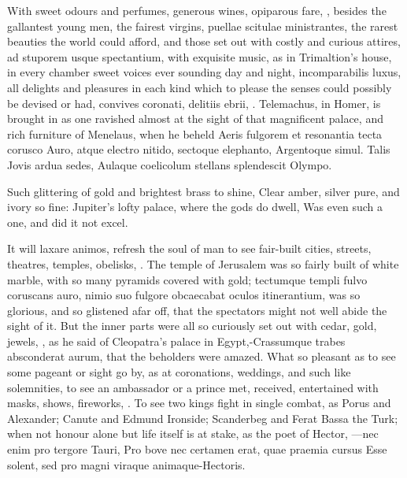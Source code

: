 {With sweet odours and perfumes, generous wines, opiparous fare, \etc{},
besides the gallantest young men, the fairest virgins, puellae
scitulae ministrantes, the rarest beauties the world could afford, and
those set out with costly and curious attires, ad stuporem usque
spectantium, with exquisite music, as in Trimaltion's house, in
every chamber sweet voices ever sounding day and night, incomparabilis
luxus, all delights and pleasures in each kind which to please the
senses could possibly be devised or had, convives coronati, delitiis
ebrii, \etc{}. Telemachus, in Homer, is brought in as one ravished almost
at the sight of that magnificent palace, and rich furniture of
Menelaus, when he beheld
Aeris fulgorem et resonantia tecta corusco
Auro, atque electro nitido, sectoque elephanto,
Argentoque simul. Talis Jovis ardua sedes,
Aulaque coelicolum stellans splendescit Olympo.

Such glittering of gold and brightest brass to shine,
Clear amber, silver pure, and ivory so fine:
Jupiter's lofty palace, where the gods do dwell,
Was even such a one, and did it not excel.

It will laxare animos, refresh the soul of man to see fair-built
cities, streets, theatres, temples, obelisks, \etc{}. The temple of
Jerusalem was so fairly built of white marble, with so many pyramids
covered with gold; tectumque templi fulvo coruscans auro, nimio suo
fulgore obcaecabat oculos itinerantium, was so glorious, and so
glistened afar off, that the spectators might not well abide the sight
of it. But the inner parts were all so curiously set out with cedar,
gold, jewels, \etc{}, as he said of Cleopatra's palace in
Egypt,-Crassumque trabes absconderat aurum, that the beholders
were amazed. What so pleasant as to see some pageant or sight go by, as
at coronations, weddings, and such like solemnities, to see an
ambassador or a prince met, received, entertained with masks, shows,
fireworks, \etc{}. To see two kings fight in single combat, as Porus and
Alexander; Canute and Edmund Ironside; Scanderbeg and Ferat Bassa the
Turk; when not honour alone but life itself is at stake, as the
poet of Hector,
---nec enim pro tergore Tauri,
Pro bove nec certamen erat, quae praemia cursus
Esse solent, sed pro magni viraque animaque-Hectoris.

}
